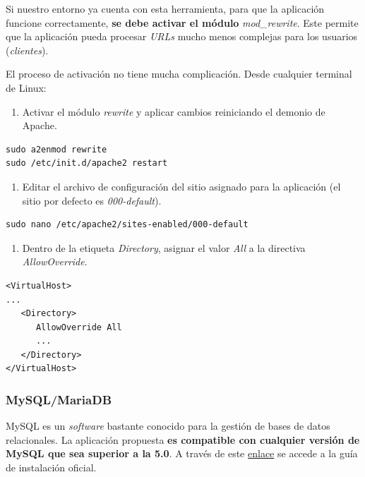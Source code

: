 \documentclass[
]{article}
\providecommand{\tightlist}{%
  \setlength{\itemsep}{0pt}\setlength{\parskip}{0pt}}
\begin{document}
Si nuestro entorno ya cuenta con esta herramienta, para que la
aplicación funcione correctamente, \textbf{se debe activar el módulo}
\emph{mod\_rewrite}. Este permite que la aplicación pueda procesar
\emph{URLs} mucho menos complejas para los usuarios (\emph{clientes}).

El proceso de activación no tiene mucha complicación. Desde cualquier
terminal de Linux:

\begin{enumerate}
\def\labelenumi{\arabic{enumi}.}
\tightlist
\item
  Activar el módulo \emph{rewrite} y aplicar cambios reiniciando el
  demonio de Apache.
\end{enumerate}

\begin{verbatim}
sudo a2enmod rewrite
sudo /etc/init.d/apache2 restart
\end{verbatim}

\begin{enumerate}
\def\labelenumi{\arabic{enumi}.}
\setcounter{enumi}{1}
\tightlist
\item
  Editar el archivo de configuración del sitio asignado para la
  aplicación (el sitio por defecto es \emph{000-default}).
\end{enumerate}

\begin{verbatim}
sudo nano /etc/apache2/sites-enabled/000-default
\end{verbatim}

\begin{enumerate}
\def\labelenumi{\arabic{enumi}.}
\setcounter{enumi}{2}
\tightlist
\item
  Dentro de la etiqueta \emph{Directory}, asignar el valor \emph{All} a
  la directiva \emph{AllowOverride}.
\end{enumerate}

\begin{verbatim}
<VirtualHost>
...
   <Directory>
      AllowOverride All
      ...
   </Directory>
</VirtualHost>
\end{verbatim}

\hypertarget{mysqlmariadb}{%
\subsubsection{MySQL/MariaDB}\label{mysqlmariadb}}

MySQL es un \emph{software} bastante conocido para la gestión de bases
de datos relacionales. La aplicación propuesta \textbf{es compatible con
cualquier versión de MySQL que sea superior a la 5.0}. A través de este
\href{https://dev.mysql.com/doc/mysql-installation-excerpt/5.7/en/}{enlace}
se accede a la guía de instalación oficial.
\end{document}
